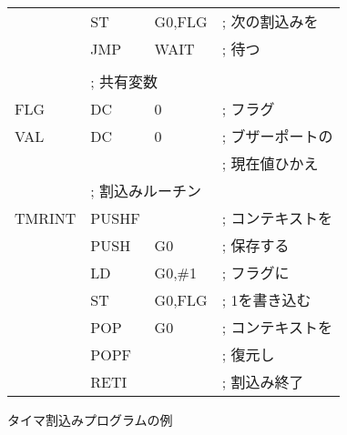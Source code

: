 \begin{figure}[btp]
{\begin{center}
\begin{tabular}{|l|l l l|}
      & ST    & G0,FLG            & ; 次の割込みを   \\
      & JMP   & WAIT              & ;   待つ         \\
      &       &                   &                  \\
      & \multicolumn{3}{|l|}{; 共有変数}             \\
FLG   & DC    & 0                 & ; フラグ         \\
VAL   & DC    & 0                 & ; ブザーポートの \\
      &       &                   & ;   現在値ひかえ \\
      & \multicolumn{3}{|l|}{; 割込みルーチン}       \\
TMRINT& PUSHF &                   & ; コンテキストを \\
      & PUSH  & G0                & ;   保存する     \\
      & LD    & G0,\#1            & ; フラグに       \\
      & ST    & G0,FLG            & ;   1を書き込む  \\
      & POP   & G0                & ; コンテキストを \\
      & POPF  &                   & ;   復元し       \\
      & RETI  &                   & ; 割込み終了     \\
\hline
\end{tabular}
\end{center}}
\caption{タイマ割込みプログラムの例}
\label{fig:chap6:timer}
\end{figure}

